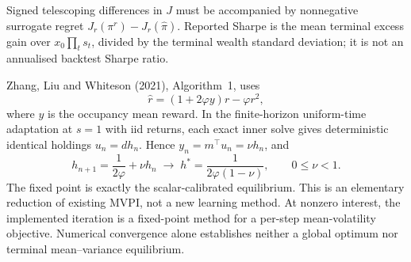 \documentclass[11pt,a4paper]{article}
\theoremstyle{plain}
\theoremstyle{definition}
\theoremstyle{remark}
\begin{document}
Signed telescoping differences in $J$ must be accompanied by nonnegative
surrogate regret $J_r(\pi^r)-J_r(\widehat\pi)$. Reported Sharpe is the mean
terminal excess gain over $x_0\prod_ts_t$, divided by the terminal wealth
standard deviation; it is not an annualised backtest Sharpe ratio.

Zhang, Liu and Whiteson (2021), Algorithm~1, uses
\[
 \widehat r=(1+2\varphi y)r-\varphi r^2,
\]
where $y$ is the occupancy mean reward. In the finite-horizon uniform-time
adaptation at $s=1$ with iid returns, each exact inner solve gives deterministic
identical holdings $u_n=dh_n$. Hence $y_n=m^{\top}u_n=\nu h_n$, and
\[
 h_{n+1}=\frac{1}{2\varphi}+\nu h_n
 \;\longrightarrow\;
 h^*=\frac{1}{2\varphi(1-\nu)},\qquad 0\le\nu<1.
\]
The fixed point is exactly the scalar-calibrated equilibrium. This is an
elementary reduction of existing MVPI, not a new learning method. At nonzero
interest, the implemented iteration is a fixed-point method for a per-step
mean-volatility objective. Numerical convergence alone establishes neither
a global optimum nor terminal mean--variance equilibrium.


\clearpage
\end{document}
